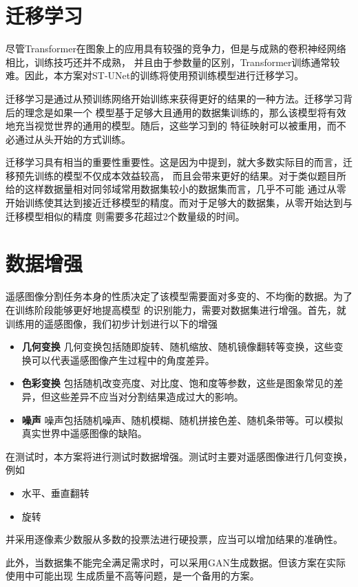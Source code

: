 \documentclass[a4paper,twoside,zihao=5,UTF8]{ctexrep}
\begin{document}
\section{迁移学习}

尽管Transformer在图象上的应用具有较强的竞争力，但是与成熟的卷积神经网络相比，训练技巧还并不成熟\cite{howtotrain}，
并且由于参数量的区别，Transformer训练通常较难。因此，本方案对ST-UNet的训练将使用预训练模型进行迁移学习。

迁移学习是通过从预训练网络开始训练来获得更好的结果的一种方法。迁移学习背后的理念是如果一个
模型基于足够大且通用的数据集训练的，那么该模型将有效地充当视觉世界的通用的模型。随后，这些学习到的
特征映射可以被重用，而不必通过从头开始的方式训练。

迁移学习具有相当的重要性重要性。这是因为\cite{howtotrain}中提到，就大多数实际目的而言，迁移预先训练的模型不仅成本效益较高，
而且会带来更好的结果。对于类似题目所给的这样数据量相对同邻域常用数据集较小的数据集而言，几乎不可能
通过从零开始训练使其达到接近迁移模型的精度。而对于足够大的数据集，从零开始达到与迁移模型相似的精度
则需要多花超过2个数量级的时间。


\section{数据增强}

遥感图像分割任务本身的性质决定了该模型需要面对多变的、不均衡的数据。为了在训练阶段能够更好地提高模型
的识别能力，需要对数据集进行增强。首先，就训练用的遥感图像，我们初步计划进行以下的增强
\begin{itemize}
    \item \textbf{几何变换} 几何变换包括随即旋转、随机缩放、随机镜像翻转等变换，这些变换可以代表遥感图像产生过程中的角度差异。
    \item \textbf{色彩变换} 包括随机改变亮度、对比度、饱和度等参数，这些是图象常见的差异，但这些差异不应当对分割结果造成过大的影响。
    \item \textbf{噪声} 噪声包括随机噪声、随机模糊、随机拼接色差、随机条带等。可以模拟真实世界中遥感图像的缺陷。
\end{itemize}
在测试时，本方案将进行测试时数据增强。测试时主要对遥感图像进行几何变换，例如
\begin{itemize}
    \item 水平、垂直翻转
    \item 旋转
\end{itemize}
并采用逐像素少数服从多数的投票法进行硬投票，应当可以增加结果的准确性。

此外，当数据集不能完全满足需求时，可以采用GAN\cite{ganaug}生成数据。但该方案在实际使用中可能出现
生成质量不高等问题，是一个备用的方案。
\end{document}
